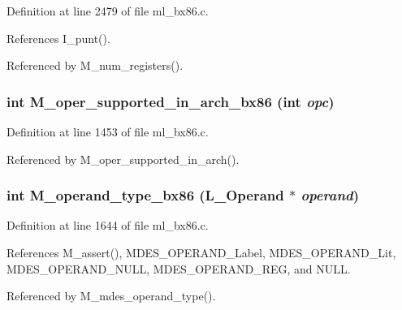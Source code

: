 Definition at line 2479 of file ml\_\-bx86.c.

References I\_\-punt().

Referenced by M\_\-num\_\-registers().
\subsubsection{\setlength{\rightskip}{0pt plus 5cm}int M\_\-oper\_\-supported\_\-in\_\-arch\_\-bx86 (int {\em opc})}\label{ml__bx86_8c_ed6d1eee3749d099ff2cca1ab122039e}




Definition at line 1453 of file ml\_\-bx86.c.

Referenced by M\_\-oper\_\-supported\_\-in\_\-arch().
\subsubsection{\setlength{\rightskip}{0pt plus 5cm}int M\_\-operand\_\-type\_\-bx86 (L\_\-Operand $\ast$ {\em operand})}\label{ml__bx86_8c_7d2d535b02535f95ace9a15d621fc39c}




Definition at line 1644 of file ml\_\-bx86.c.

References M\_\-assert(), MDES\_\-OPERAND\_\-Label, MDES\_\-OPERAND\_\-Lit, MDES\_\-OPERAND\_\-NULL, MDES\_\-OPERAND\_\-REG, and NULL.

Referenced by M\_\-mdes\_\-operand\_\-type().